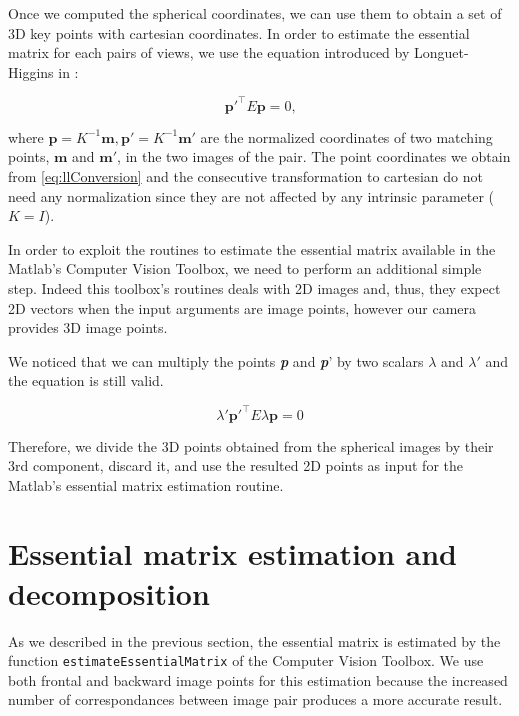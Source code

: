 Once we computed the spherical coordinates, we can use them to obtain a set of 3D 
key points with cartesian coordinates. In order to estimate the essential 
matrix for each pairs of views, we use the equation introduced by 
Longuet-Higgins in \cite{longuet1981computer}:

\begin{equation}
\mathbf{p}'^\top E\mathbf{p} = 0 \text{,}
\end{equation}

\noindent where 
\begin{math}\mathbf{p} = K^{-1} \mathbf{m},
\mathbf{p}' = K^{-1} \mathbf{m}'\end{math} are the normalized coordinates of 
two matching points, \begin{math}\mathbf{m}\end{math} and
\begin{math}\mathbf{m'}\end{math}, in the two images of the pair.
The point coordinates we obtain from \ref{eq:llConversion} and the consecutive 
transformation to cartesian do not need any normalization since they are not 
affected by any intrinsic parameter
(\begin{math}K = I\end{math}).

In order to exploit the routines to estimate the essential matrix available 
in the Matlab's Computer Vision Toolbox, we need to perform an additional simple 
step.
Indeed this toolbox's routines deals with 2D images and, thus, they expect 
2D vectors when the input arguments are image points, however our camera
provides 3D image points.

We noticed that we can multiply the points \textbf{\textit{p}}
and \textbf{\textit{p}}' by two 
scalars \begin{math}{\lambda}\end{math} and 
\begin{math}{\lambda}'\end{math} and the equation is still valid.

\begin{equation*}
\lambda'\mathbf{p}'^\top E\lambda\mathbf{p} = 0
\end{equation*}

Therefore, we divide the 3D points obtained from the spherical images by their 
3rd component, discard it, and use the resulted 2D points as input for the 
Matlab's essential matrix estimation routine.

\section{Essential matrix estimation and decomposition}
As we described in the previous section, the essential matrix is estimated 
by the function {\tt estimateEssentialMatrix} of the Computer Vision Toolbox.
We use both frontal and backward image points for this estimation because
the increased number of correspondances between image pair produces 
a more accurate result.

